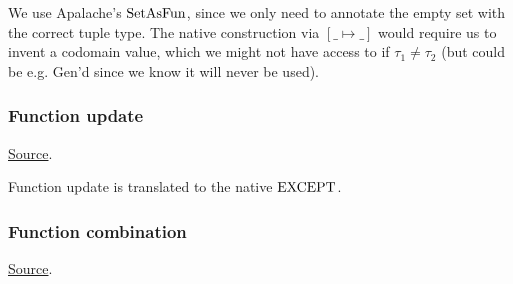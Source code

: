 
\begin{mathpar}
\end{mathpar}
We use Apalache's $\SetAsFun$, since we only need to annotate the empty set with the correct tuple type. The native construction via $[ \_ \mapsto \_]$ would require us to invent a codomain value, which we might not have access to if $\tau_1 \ne \tau_2$ (but could be e.g. $\mathrm{Gen}$'d since we know it will never be used).

\subsubsection{ Function update}
\href{https://github.com/saltiniroberto/ssf/blob/7ea6e18093d9da3154b4e396dd435549f687e6b9/high_level/common/pythonic_code_generic.py#L113-L114}{Source}.



\begin{mathpar}
\end{mathpar}
Function update is translated to the \tlap{} native $\EXCEPT$.

\subsubsection{ Function combination}
\href{https://github.com/saltiniroberto/ssf/blob/7ea6e18093d9da3154b4e396dd435549f687e6b9/high_level/common/pythonic_code_generic.py#L117-L118}{Source}.


